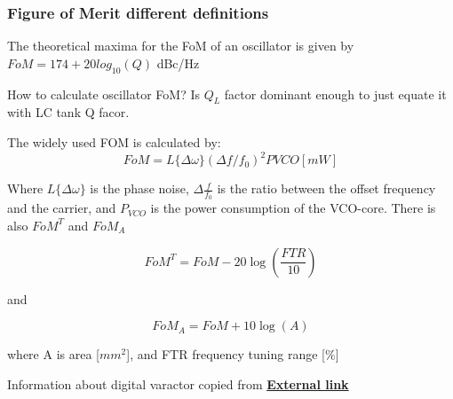 \subsubsection{Figure of Merit different definitions}

\begin{info} %
	The theoretical maxima for the FoM of an oscillator is given by $FoM=174+20log_{10}(Q)$ dBc/Hz
\end{info}

How to calculate oscillator FoM? Is $Q_L$ factor dominant enough to just equate it with LC tank Q facor.

The widely used FOM is calculated by:
\begin{equation}
	FoM = L\{ \Delta \omega \}( \Delta f/f_0)^2 PVCO [mW]
\end{equation}

Where $L\{\Delta \omega\}$ is the phase noise, $ \Delta \frac{f}{f_0}$ is the ratio between the offset frequency and the carrier, and $P_{VCO}$ is the power consumption of the VCO-core. There is also $FoM^T$ and $FoM_A$ 

\begin{equation}
	FoM^T = FoM - 20 \log (\dfrac{FTR}{10})
\end{equation}

and 

\begin{equation}
	FoM_A = FoM + 10 \log (A)
\end{equation}

where A is area [$mm^2$], and FTR frequency tuning range [$\%$]

Information about digital varactor copied from \href{https://www.doe.carleton.ca/~ddchen/Tutorials/DCO.pdf}{\textbf{External link}}

